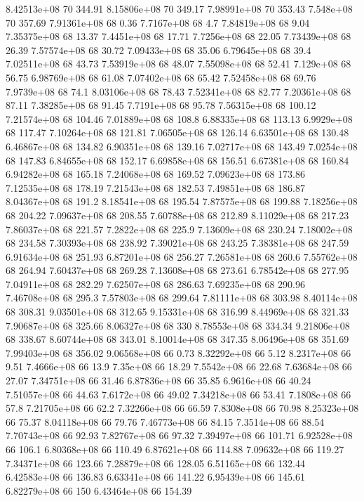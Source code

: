 8.42513e+08 70 344.91
8.15806e+08 70 349.17
7.98991e+08 70 353.43
7.548e+08 70 357.69
7.91361e+08 68 0.36
7.7167e+08 68 4.7
7.84819e+08 68 9.04
7.35375e+08 68 13.37
7.4451e+08 68 17.71
7.7256e+08 68 22.05
7.73439e+08 68 26.39
7.57574e+08 68 30.72
7.09433e+08 68 35.06
6.79645e+08 68 39.4
7.02511e+08 68 43.73
7.53919e+08 68 48.07
7.55098e+08 68 52.41
7.129e+08 68 56.75
6.98769e+08 68 61.08
7.07402e+08 68 65.42
7.52458e+08 68 69.76
7.9739e+08 68 74.1
8.03106e+08 68 78.43
7.52341e+08 68 82.77
7.20361e+08 68 87.11
7.38285e+08 68 91.45
7.7191e+08 68 95.78
7.56315e+08 68 100.12
7.21574e+08 68 104.46
7.01889e+08 68 108.8
6.88335e+08 68 113.13
6.9929e+08 68 117.47
7.10264e+08 68 121.81
7.06505e+08 68 126.14
6.63501e+08 68 130.48
6.46867e+08 68 134.82
6.90351e+08 68 139.16
7.02717e+08 68 143.49
7.0254e+08 68 147.83
6.84655e+08 68 152.17
6.69858e+08 68 156.51
6.67381e+08 68 160.84
6.94282e+08 68 165.18
7.24068e+08 68 169.52
7.09623e+08 68 173.86
7.12535e+08 68 178.19
7.21543e+08 68 182.53
7.49851e+08 68 186.87
8.04367e+08 68 191.2
8.18541e+08 68 195.54
7.87575e+08 68 199.88
7.18256e+08 68 204.22
7.09637e+08 68 208.55
7.60788e+08 68 212.89
8.11029e+08 68 217.23
7.86037e+08 68 221.57
7.2822e+08 68 225.9
7.13609e+08 68 230.24
7.18002e+08 68 234.58
7.30393e+08 68 238.92
7.39021e+08 68 243.25
7.38381e+08 68 247.59
6.91634e+08 68 251.93
6.87201e+08 68 256.27
7.26581e+08 68 260.6
7.55762e+08 68 264.94
7.60437e+08 68 269.28
7.13608e+08 68 273.61
6.78542e+08 68 277.95
7.04911e+08 68 282.29
7.62507e+08 68 286.63
7.69235e+08 68 290.96
7.46708e+08 68 295.3
7.57803e+08 68 299.64
7.81111e+08 68 303.98
8.40114e+08 68 308.31
9.03501e+08 68 312.65
9.15331e+08 68 316.99
8.44969e+08 68 321.33
7.90687e+08 68 325.66
8.06327e+08 68 330
8.78553e+08 68 334.34
9.21806e+08 68 338.67
8.60744e+08 68 343.01
8.10014e+08 68 347.35
8.06496e+08 68 351.69
7.99403e+08 68 356.02
9.06568e+08 66 0.73
8.32292e+08 66 5.12
8.2317e+08 66 9.51
7.4666e+08 66 13.9
7.35e+08 66 18.29
7.5542e+08 66 22.68
7.63684e+08 66 27.07
7.34751e+08 66 31.46
6.87836e+08 66 35.85
6.9616e+08 66 40.24
7.51057e+08 66 44.63
7.6172e+08 66 49.02
7.34218e+08 66 53.41
7.1808e+08 66 57.8
7.21705e+08 66 62.2
7.32266e+08 66 66.59
7.8308e+08 66 70.98
8.25323e+08 66 75.37
8.04118e+08 66 79.76
7.46773e+08 66 84.15
7.3514e+08 66 88.54
7.70743e+08 66 92.93
7.82767e+08 66 97.32
7.39497e+08 66 101.71
6.92528e+08 66 106.1
6.80368e+08 66 110.49
6.87621e+08 66 114.88
7.09632e+08 66 119.27
7.34371e+08 66 123.66
7.28879e+08 66 128.05
6.51165e+08 66 132.44
6.42583e+08 66 136.83
6.63341e+08 66 141.22
6.95439e+08 66 145.61
6.82279e+08 66 150
6.43464e+08 66 154.39
